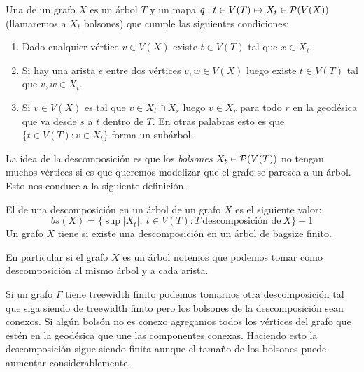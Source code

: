 \documentclass[tesis.tex]{subfiles}
\begin{document}
\begin{deff}\label{desc-arbol}
	 Una  de un grafo $X$ es un árbol $T$ y un mapa $q:t \in V(T) \mapsto X_t \in {\cal P}(V(X))$ (llamaremos a $X_t$ bolsones) que cumple las siguientes condiciones:
	\begin{enumerate}
		\item Dado cualquier vértice $v \in V(X)$ existe $t \in V(T)$ tal que $x \in X_t$. 
		\item Si hay una arista $e$ entre dos vértices $v,w \in V(X)$ luego existe $t \in V(T)$ tal que $v,w \in X_t$.
		\item Si $v \in V(X)$ es tal que $v \in X_t \cap X_s$ luego $v \in X_r$ para todo $r$ en la geodésica que va desde $s$ a $t$ dentro de $T$. En otras palabras esto es que $\{ t \in V(T) :  v \in X_t \}$ forma un subárbol. 
	\end{enumerate} 
\end{deff}
\smallskip

La idea de la descomposición es que los \emph{bolsones} $X_t \in {\cal P}(V(T))$ no tengan muchos vértices si es que queremos modelizar que el grafo se parezca a un árbol. Esto nos conduce a la siguiente definición.

\begin{deff}
El  de una descomposición en un árbol de un grafo $X$ es el siguiente valor:
	\begin{equation*}
		bs(X) = \{ \sup |X_t|, \ t \in V(T) : T \ \text{descomposición de} \ X  \} - 1
	\end{equation*}
Un grafo $X$ tiene  si existe una descomposición en un árbol de bagsize finito.	
\end{deff}
\begin{obs}
 En particular si el grafo $X$ es un árbol notemos que podemos tomar como descomposición al mismo árbol y a cada arista.
\end{obs}


\begin{obs}
	Si un grafo $\Gamma$ tiene treewidth finito podemos tomarnos otra descomposición tal que siga siendo de treewidth finito pero los bolsones de la descomposición sean conexos. Si algún bolsón no es conexo agregamos todos los vértices del grafo que estén en la geodésica que une las componentes conexas. Haciendo esto la descomposición sigue siendo finita aunque el tamaño de los bolsones puede aumentar considerablemente.
\end{obs}
\end{document}
